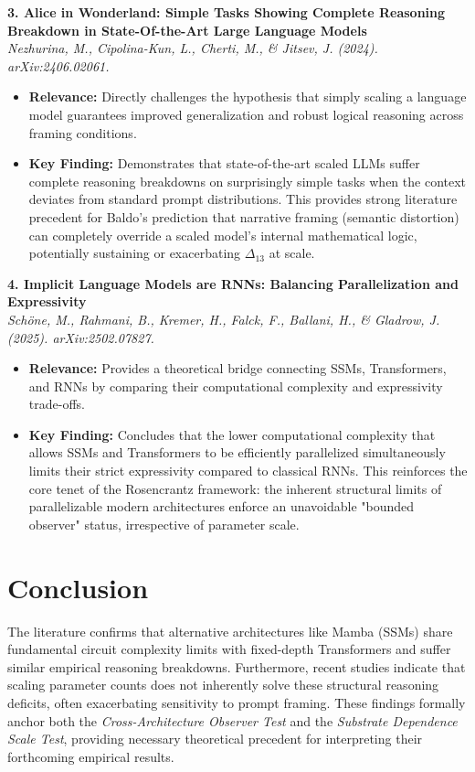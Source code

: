 \documentclass[12pt,a4paper]{article}
\begin{document}
\vspace{1em}
\noindent\textbf{3. Alice in Wonderland: Simple Tasks Showing Complete Reasoning Breakdown in State-Of-the-Art Large Language Models}\\
\textit{Nezhurina, M., Cipolina-Kun, L., Cherti, M., \& Jitsev, J. (2024). arXiv:2406.02061.}
\begin{itemize}
    \item \textbf{Relevance:} Directly challenges the hypothesis that simply scaling a language model guarantees improved generalization and robust logical reasoning across framing conditions.
    \item \textbf{Key Finding:} Demonstrates that state-of-the-art scaled LLMs suffer complete reasoning breakdowns on surprisingly simple tasks when the context deviates from standard prompt distributions. This provides strong literature precedent for Baldo's prediction that narrative framing (semantic distortion) can completely override a scaled model's internal mathematical logic, potentially sustaining or exacerbating $\Delta_{13}$ at scale.
\end{itemize}

\vspace{1em}
\noindent\textbf{4. Implicit Language Models are RNNs: Balancing Parallelization and Expressivity}\\
\textit{Schöne, M., Rahmani, B., Kremer, H., Falck, F., Ballani, H., \& Gladrow, J. (2025). arXiv:2502.07827.}
\begin{itemize}
    \item \textbf{Relevance:} Provides a theoretical bridge connecting SSMs, Transformers, and RNNs by comparing their computational complexity and expressivity trade-offs.
    \item \textbf{Key Finding:} Concludes that the lower computational complexity that allows SSMs and Transformers to be efficiently parallelized simultaneously limits their strict expressivity compared to classical RNNs. This reinforces the core tenet of the Rosencrantz framework: the inherent structural limits of parallelizable modern architectures enforce an unavoidable "bounded observer" status, irrespective of parameter scale.
\end{itemize}

\section{Conclusion}

The literature confirms that alternative architectures like Mamba (SSMs) share fundamental circuit complexity limits with fixed-depth Transformers and suffer similar empirical reasoning breakdowns. Furthermore, recent studies indicate that scaling parameter counts does not inherently solve these structural reasoning deficits, often exacerbating sensitivity to prompt framing. These findings formally anchor both the \textit{Cross-Architecture Observer Test} and the \textit{Substrate Dependence Scale Test}, providing necessary theoretical precedent for interpreting their forthcoming empirical results.
\end{document}
